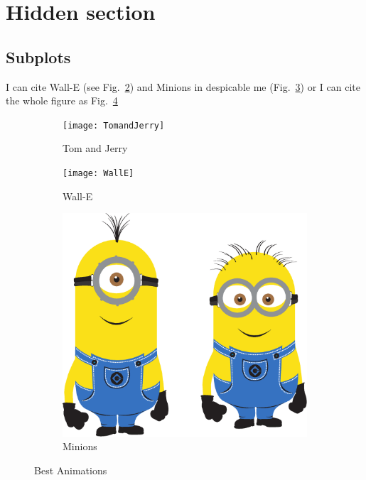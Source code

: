 \tochide\section{Hidden section}



\begin{landscape}

\section*{Subplots}
I can cite Wall-E (see Fig.~\ref{fig:WallE}) and Minions in despicable me (Fig.~\ref{fig:Minnion}) or I can cite the whole figure as Fig.~\ref{fig:animations}


\begin{figure}
  \centering
  \begin{subfigure}[b]{0.3\textwidth}
    \texttt{[image: TomandJerry]}
    \caption{Tom and Jerry}
    \label{fig:TomJerry}   
  \end{subfigure}             
  \begin{subfigure}[b]{0.3\textwidth}
    \texttt{[image: WallE]}
    \caption{Wall-E}
    \label{fig:WallE}
  \end{subfigure}             
  \begin{subfigure}[b]{0.3\textwidth}
    \includegraphics[width=\textwidth]{minion}
    \caption{Minions}
    \label{fig:Minnion}
  \end{subfigure}
  \caption{Best Animations}
  \label{fig:animations}
\end{figure}


\end{landscape}
